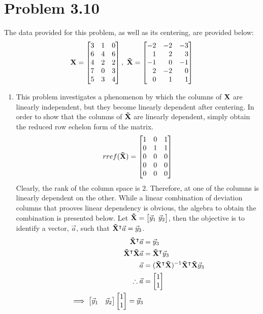 \section*{Problem 3.10}
The data provided for this problem, as well as its centering, are provided below:
$$
\mf{X} = \m{3 & 1 & 0 \\ 6 & 4 & 6 \\ 4 & 2 & 2 \\ 7 & 0 & 3 \\ 5 & 3 & 4},\ 
\mf{\tilde{X}} = \m{-2 & -2 & -3 \\ 1 & 2 & 3 \\ -1 & 0 & -1 \\ 2 & -2 & 0 \\ 0 & 1 & 1}
$$
\renewcommand{\labelenumi}{\alph{enumi})}
\begin{enumerate}
	\item This problem investigates a phenomenon by which the columns of $\mathrm{\bf{X}}$ are linearly independent, but they become linearly dependent after centering. In order to show that the columns of $\mathrm{\bf{\tilde{X}}}$ are linearly dependent, simply obtain the reduced row echelon form of the matrix.
		$$
		rref(\mf{\tilde{X}}) = \m{1 & 0 & 1 \\ 0 & 1 & 1 \\ 0 & 0 & 0 \\ 0 & 0 & 0 \\ 0 & 0 & 0}
		$$
		Clearly, the rank of the column space is $2$. Therefore, at one of the columns is linearly dependent on the other. While a linear combination of deviation columns that prooves linear dependency is obvious, the algebra to obtain the combination is presented below. Let $\mf{\tilde{X}} = \m{\vec{y}_1\ \vec{y}_2}$, then the objective is to identify a vector, $\vec{a}$, such that $\mathrm{\bf{\tilde{X}}}^{\intercal} \vec{a} = \vec{y}_3$.
		\begin{align*}
			\mf{\tilde{X}}^{\T} \vec{a} &= \vec{y}_3 \\
			\mf{\tilde{X}}^{\T} \mf{\tilde{X}} \vec{a} &= \mf{\tilde{X}}^{\T} \vec{y}_3 \\
			\vec{a} &= (\mf{\tilde{X}}^{\T} \mf{\tilde{X}})^{-1} \mf{\tilde{X}}^{\T} \mf{\tilde{X}} \vec{y}_3 \\
			\therefore \vec{a} &= \m{1 \\ 1} \\
			\implies \m{\vec{y}_1 & \vec{y}_2} \m{1 \\ 1} = \vec{y}_3
		\end{align*}


\end{enumerate}
